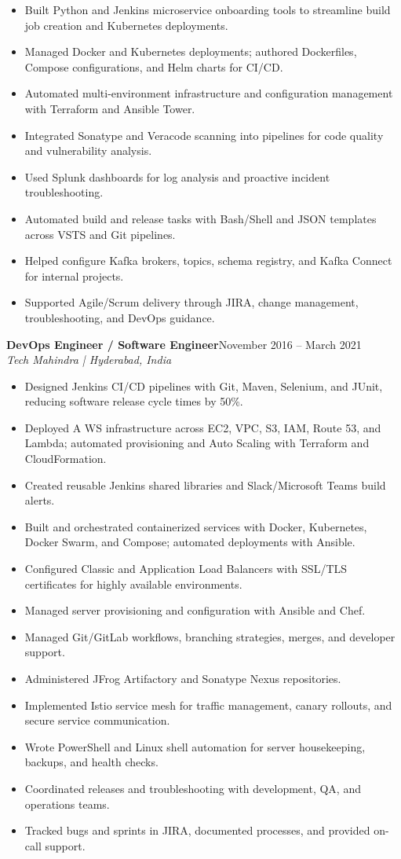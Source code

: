\documentclass[letterpaper,10pt]{article}
\newcommand{\resumeRole}[4]{\Needspace{5\baselineskip}\textbf{#1}\hfill #2\\\textit{#3 | #4}\par\vspace{-3pt}}
\begin{document}
\begin{itemize}
\item Built Python and Jenkins microservice onboarding tools to streamline build job creation and Kubernetes deployments.
\item Managed Docker and Kubernetes deployments; authored Dockerf{}iles, Compose configurations, and Helm charts for CI/CD.
\item Automated multi-environment infrastructure and configuration management with Terraform and Ansible Tower.
\item Integrated Sonatype and Veracode scanning into pipelines for code quality and vulnerability analysis.
\item Used Splunk dashboards for log analysis and proactive incident troubleshooting.
\item Automated build and release tasks with Bash/Shell and JSON templates across VSTS and Git pipelines.
\item Helped configure Kafka brokers, topics, schema registry, and Kafka Connect for internal projects.
\item Supported Agile/Scrum delivery through JIRA, change management, troubleshooting, and DevOps guidance.
\end{itemize}
\resumeRole{DevOps Engineer / Software Engineer}{November 2016 -- March 2021}{Tech Mahindra}{Hyderabad, India}
\begin{itemize}
\item Designed Jenkins CI/CD pipelines with Git, Maven, Selenium, and JUnit, reducing software release cycle times by 50\%.
\item Deployed A\kern0pt WS infrastructure across EC2, VPC, S3, IAM, Route 53, and Lambda; automated provisioning and Auto Scaling with Terraform and CloudFormation.
\item Created reusable Jenkins shared libraries and Slack/Microsoft Teams build alerts.
\item Built and orchestrated containerized services with Docker, Kubernetes, Docker Swarm, and Compose; automated deployments with Ansible.
\item Configured Classic and Application Load Balancers with SSL/TLS certificates for highly available environments.
\item Managed server provisioning and configuration with Ansible and Chef.
\item Managed Git/GitLab workflows, branching strategies, merges, and developer support.
\item Administered JFrog Artifactory and Sonatype Nexus repositories.
\item Implemented Istio service mesh for traffic management, canary rollouts, and secure service communication.
\item Wrote PowerShell and Linux shell automation for server housekeeping, backups, and health checks.
\item Coordinated releases and troubleshooting with development, QA, and operations teams.
\item Tracked bugs and sprints in JIRA, documented processes, and provided on-call support.
\end{itemize}
\end{document}
